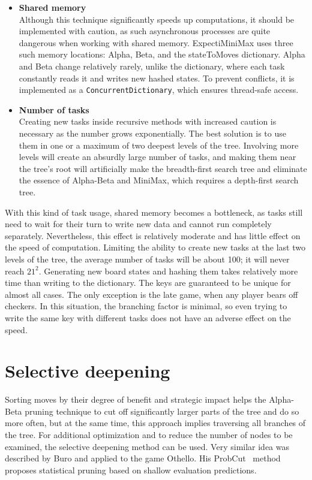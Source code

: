 \begin{itemize}
    \item \textbf{Shared memory} \\
    Although this technique significantly speeds up computations, it should be implemented with caution, as such asynchronous processes are quite dangerous when working with shared memory. ExpectiMiniMax uses three such memory locations: Alpha, Beta, and the stateToMoves dictionary. Alpha and Beta change relatively rarely, unlike the dictionary, where each task constantly reads it and writes new hashed states. To prevent conflicts, it is implemented as a \texttt{ConcurrentDictionary}, which ensures thread-safe access. 

    \item \textbf{Number of tasks} \\
    Creating new tasks inside recursive methods with increased caution is necessary as the number grows exponentially. The best solution is to use them in one or a maximum of two deepest levels of the tree. Involving more levels will create an absurdly large number of tasks, and making them near the tree's root will artificially make the breadth-first search tree and eliminate the essence of Alpha-Beta and MiniMax, which requires a depth-first search tree.
\end{itemize}

With this kind of task usage, shared memory becomes a bottleneck, as tasks still need to wait for their turn to write new data and cannot run completely separately. Nevertheless, this effect is relatively moderate and has little effect on the speed of computation. Limiting the ability to create new tasks at the last two levels of the tree, the average number of tasks will be about 100; it will never reach $21^2$. Generating new board states and hashing them takes relatively more time than writing to the dictionary. The keys are guaranteed to be unique for almost all cases. The only exception is the late game, when any player bears off checkers. In this situation, the branching factor is minimal, so even trying to write the same key with different tasks does not have an adverse effect on the speed.


\section{Selective deepening}

Sorting moves by their degree of benefit and strategic impact helps the Alpha-Beta pruning technique to cut off significantly larger parts of the tree and do so more often, but at the same time, this approach implies traversing all branches of the tree. For additional optimization and to reduce the number of nodes to be examined, the selective deepening method can be used. Very similar idea was described by Buro and applied to the game Othello. His ProbCut~\cite{buro1995probcut} method proposes statistical pruning based on shallow evaluation predictions.

